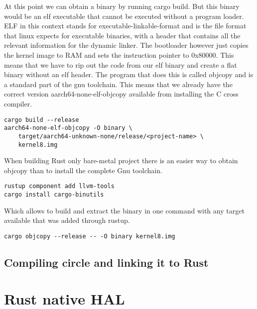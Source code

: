 At this point we can obtain a binary by running cargo build.
But this binary would be an elf executable that cannot be executed without a program loader.
ELF in this context stands for executable-linkable-format and is the file format that linux expects for executable binaries,
with a header that contains all the relevant information for the dynamic linker.
The bootloader however just copies the kernel image to RAM and sets the instruction pointer to 0x80000.
This means that we have to rip out the code from our elf binary and create a flat binary without an elf header.
The program that does this is called objcopy and is a standard part of the gnu toolchain.
This means that we already have the correct version aarch64-none-elf-objcopy available from installing the C cross compiler.

\begin{verbatim}
cargo build --release
aarch64-none-elf-objcopy -O binary \
    target/aarch64-unknown-none/release/<project-name> \
    kernel8.img
\end{verbatim}

When building Rust only bare-metal project there is an easier way to obtain objcopy than to install the complete Gnu toolchain.
\begin{verbatim}
rustup component add llvm-tools
cargo install cargo-binutils
\end{verbatim}
Which allows to build and extract the binary in one command with any target available that was added through rustup.
\begin{verbatim}
cargo objcopy --release -- -O binary kernel8.img
\end{verbatim}

\subsection{Compiling circle and linking it to Rust}
\label{sec:concept_and_implementation:bare-metal:ffi}

\section{Rust native HAL}
\label{sec:concept_and_implementation:hal}